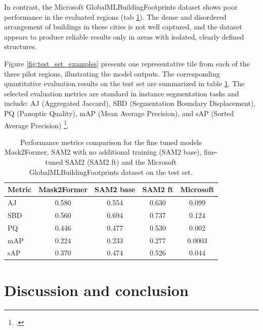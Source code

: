 \begin{refsection}
In contrast, the Microsoft GlobalMLBuildingFootprints dataset shows poor performance in the evaluated regions (tab \ref{tab:combined_eval}). The dense and disordered arrangement of buildings in these cities is not well captured, and the dataset appears to produce reliable results only in areas with isolated, clearly defined structures.

Figure \ref{fig:test_set_examples} presents one representative tile from each of the three pilot regions, illustrating the model outputs. The corresponding quantitative evaluation results on the test set are summarized in table \ref{tab:combined_eval}. The selected evaluation metrics are standard in instance segmentation tasks and include: AJ (Aggregated Jaccard), SBD (Segmentation Boundary Displacement), PQ (Panoptic Quality), mAP (Mean Average Precision), and sAP (Sorted Average Precision) \footcite{Chen_2023_ICCV}.

\begin{table}[htbp]
\centering
\caption{Performance metrics comparison for the fine tuned models Mask2Former, SAM2 with no additional training (SAM2 base), fine-tuned SAM2 (SAM2 ft) and the Microsoft GlobalMLBuildingFootprints dataset on the test set.}
\begin{tabular}{|l|c|c|c|c|}
\hline
\textbf{Metric} & \textbf{Mask2Former} & \textbf{SAM2 base} & \textbf{SAM2 ft} & \textbf{Microsoft} \\
\hline
AJ & 0.580 & 0.554 & 0.630 & 0.099 \\
SBD & 0.560 & 0.694 & 0.737 & 0.124 \\
PQ & 0.446 & 0.477 & 0.530 & 0.002 \\
mAP & 0.224 & 0.233 & 0.277 & 0.0003 \\
sAP & 0.370 & 0.474 & 0.526 & 0.044 \\
\hline
\end{tabular}
\label{tab:combined_eval}
\end{table}

\renewcommand{\sectionnametext}{Discussion and conclusion}
\renewcommand{\headingtextR}{\thesection. \sectionnametext}
\section{\sectionnametext}


\end{refsection}
